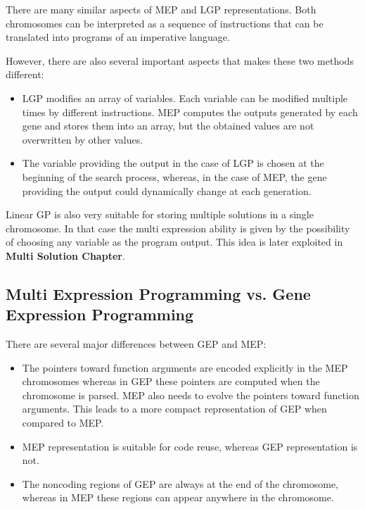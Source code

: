 \documentclass [11pt]{article}
\begin{document}
There are many similar aspects of MEP and LGP representations. Both chromosomes can be interpreted as a sequence of instructions that can be translated into programs of an imperative language.

However, there are also several important aspects that makes these two methods different:

\begin{itemize}

\item{LGP modifies an array of variables. Each variable can be modified multiple times by different instructions. MEP computes the outputs generated by each gene and stores them into an array, but the obtained values are not overwritten by other values.}

\item{The variable providing the output in the case of LGP is chosen at the beginning of the search process, whereas, in the case of MEP, the gene providing the output could dynamically change at each generation.}

\end{itemize}

Linear GP \cite{brameier1} is also very suitable for storing multiple solutions in a 
single chromosome. In that case the multi expression ability is given by the 
possibility of choosing any variable as the program output. This idea is later exploited in  \textbf{Multi Solution Chapter}.

\subsection{Multi Expression Programming vs. Gene Expression Programming}

There are several major differences between GEP and MEP:

\begin{itemize}

\item{The pointers toward function arguments are encoded explicitly in the MEP chromosomes whereas in GEP these pointers are computed when the chromosome is parsed. MEP also needs to evolve the pointers toward function arguments. This leads to a more compact representation of GEP when compared to MEP.}

\item{MEP representation is suitable for code reuse, whereas GEP representation is not.}

\item{The noncoding regions of GEP are always at the end of the chromosome, whereas in MEP these regions can appear anywhere in the chromosome.}

\end{itemize}
\end{document}

